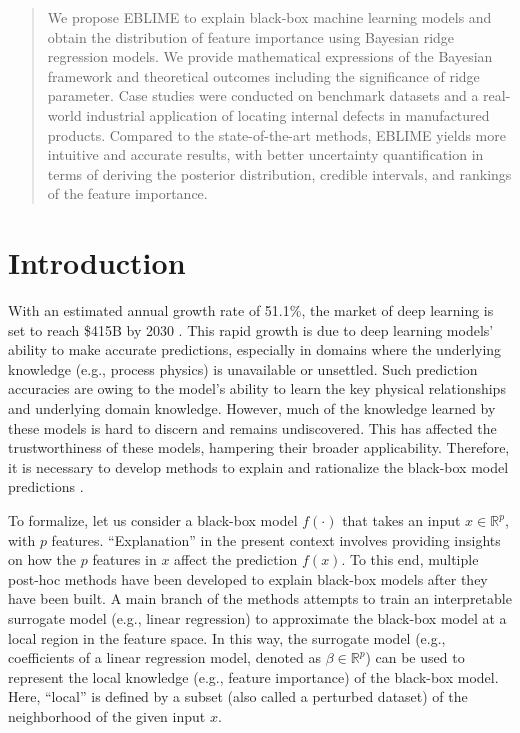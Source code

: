 \documentclass{article}
\theoremstyle{plain}
\theoremstyle{definition}
\theoremstyle{remark}
\begin{document}
\begin{abstract}
We propose EBLIME to explain black-box machine learning models and obtain the distribution of feature importance using Bayesian ridge regression models. We provide mathematical expressions of the Bayesian framework and theoretical outcomes including the significance of ridge parameter. Case studies were conducted on benchmark datasets and a real-world industrial application of locating internal defects in manufactured products. Compared to the state-of-the-art methods, EBLIME yields more intuitive and accurate results, with better uncertainty quantification in terms of deriving the posterior distribution, credible intervals, and rankings of the feature importance. 
\end{abstract}

\section{Introduction}
With an estimated annual growth rate of 51.1\%, the market of deep learning is set to reach \$415B by 2030 \cite{acumen2022}. This rapid growth is due to deep learning models’ ability to make accurate predictions, especially in domains where the underlying knowledge (e.g., process physics) is unavailable or unsettled. Such prediction accuracies are owing to the model's ability to learn the key physical relationships and underlying domain knowledge. However, much of the knowledge learned by these models is hard to discern and remains undiscovered. This has affected the trustworthiness of these models, hampering their broader applicability. Therefore, it is necessary to develop methods to explain and rationalize the black-box model predictions \cite{zhong2022}.

To formalize, let us consider a black-box model $f(\cdot)$ that takes an input $x \in \mathbb{R}^{p}$, with $p$ features. ``Explanation'' in the present context involves providing insights on how the $p$ features in $x$ affect the prediction $f(x)$. To this end, multiple post-hoc methods have been developed to explain black-box models after they have been built. A main branch of the methods attempts to train an interpretable surrogate model (e.g., linear regression) to approximate the black-box model at a local region in the feature space. In this way, the surrogate model (e.g., coefficients of a linear regression model, denoted as $\beta \in \mathbb{R}^{p}$) can be used to represent the local knowledge (e.g., feature importance) of the black-box model. Here, ``local'' is defined by a subset (also called a perturbed dataset) of the neighborhood of the given input $x$.
\end{document}
